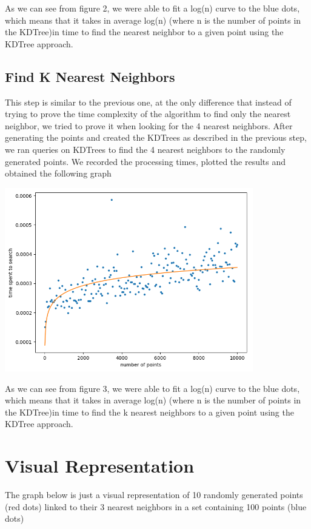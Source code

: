 \documentclass[]{article}
\begin{document}
  		As we can see from figure 2, we were able to fit a log(n) curve to the blue dots, which means that it takes in average log(n) (where n is the number of points in the KDTree)in time to find the nearest neighbor to a given point using the KDTree approach.
  		
  	\subsection{Find K Nearest Neighbors}
  		
  		This step is similar to the previous one, at the only difference that instead of trying to prove the time complexity of the algorithm to find only the nearest neighbor, we tried to prove it when looking for the 4 nearest neighbors. After generating the points and created the KDTrees as described in the previous step, we ran queries on KDTrees to find the 4 nearest neighbors to the randomly generated points. We recorded the processing times, plotted the results and obtained the following graph
  		
  		{\centering
  			\includegraphics[width=\textwidth, height=8cm,keepaspectratio]{k_nearest_n.png}
  			
  			\par}
  		
  		As we can see from figure 3, we were able to fit a log(n) curve to the blue dots, which means that it takes in average log(n) (where n is the number of points in the KDTree)in time to find the k nearest neighbors to a given point using the KDTree approach.
 \section{Visual Representation}
 		The graph below is just a visual representation of 10 randomly generated points (red dots) linked to their 3 nearest neighbors in a set containing 100 points (blue dots)
 		
\end{document}
